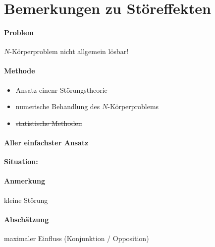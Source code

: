 \section{Bemerkungen zu Störeffekten}
\paragraph{Problem} $N$-Körperproblem nicht allgemein lösbar!

\paragraph{Methode}
\begin{itemize}
    \item Ansatz einenr Störungstheorie
    \item numerische Behandlung des $N$-Körperproblems
    \item \sout{statistische Methoden}
\end{itemize}

\paragraph{Aller einfachster Ansatz}
\textbf{Situation:}
\begin{center}
\end{center}

\paragraph{Anmerkung} kleine Störung

\paragraph{Abschätzung} maximaler Einfluss (Konjunktion / Opposition)

